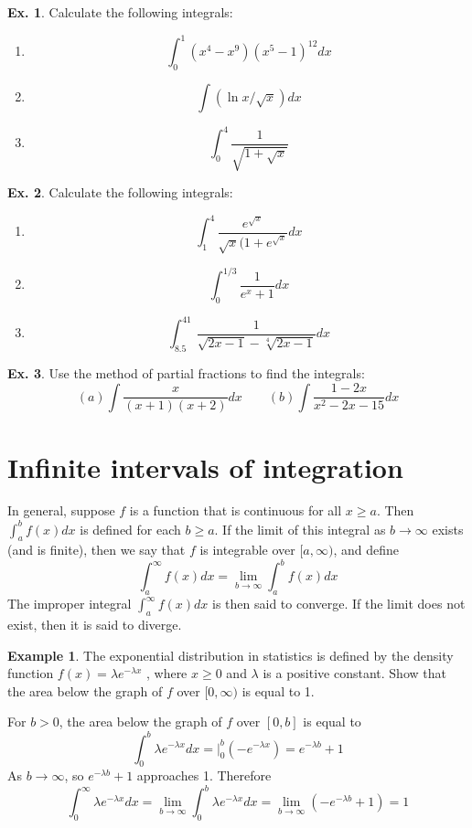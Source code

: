 \documentclass[10pt,a4paper]{book}
\theoremstyle{definition}\newtheorem{definition}{Definition}
\theoremstyle{definition}\newtheorem{fact}{Fact}
\theoremstyle{definition}\newtheorem{ex}{Ex.}
\theoremstyle{definition}\newtheorem{project}{Project}
\theoremstyle{definition}\newtheorem{problem}{Problem}
\theoremstyle{definition}\newtheorem{example}{Example}
\numberwithin{theorem}{chapter}
\numberwithin{corollary}{chapter}
\numberwithin{assumption}{chapter}
\numberwithin{definition}{chapter}
\numberwithin{prop}{chapter}
\numberwithin{notation}{chapter}
\numberwithin{problem}{chapter}
\numberwithin{example}{chapter}
\numberwithin{fact}{chapter}
\numberwithin{ex}{chapter}
\begin{document}
	\begin{ex}
		Calculate the following integrals:
		\begin{enumerate}[label=(\alph*)]
			\item $$\int_0^1 (x^4-x^9)(x^5-1)^{12}dx$$
			\item $$\int (\ln x/\sqrt{x})dx$$
			\item $$\int_0^4 \frac{1}{\sqrt{1+\sqrt{x}}}$$
		\end{enumerate}
	\end{ex}
	
	\begin{ex}
		Calculate the following integrals:
		\begin{enumerate}[label=(\alph*)]
			\item $$\int_1^4 \frac{e^{\sqrt{x}}}{\sqrt{x}(1+e^{\sqrt{x}}}dx$$
			\item $$\int_0^{1/3} \frac{1}{e^x+1} dx$$
			\item $$\int_{8.5}^{41} \frac{1}{\sqrt{2x-1}-\sqrt[4]{2x-1}}dx$$
		\end{enumerate}
	\end{ex}
	
	\begin{ex}
		Use the method of partial fractions to find the integrals:
		\begin{equation*}
			(a) \int \frac{x}{(x+1)(x+2)}dx \qquad
			(b) \int \frac{1-2x}{x^2-2x-15}dx
		\end{equation*}
	\end{ex}
	
	\section{Infinite intervals of integration}
	
	In general, suppose $f$ is a function that is continuous for all $x \geq a$. Then $\int_a^b f(x)dx$ is defined for each $b \geq a$. If the limit of this integral as $b \rightarrow \infty$ exists (and is finite), then we say that $f$ is integrable over $[a, \infty)$, and define
	$$\int_a^{\infty} f(x) dx = \lim_{b \rightarrow \infty} \int_a^b f(x) dx$$
	The improper integral $\int_a^{\infty} f(x)dx$ is then said to converge. If the limit does not exist, then it is said to diverge.
	
	\begin{example}
		The exponential distribution in statistics is defined by the density function $f (x) = \lambda e^{-\lambda x}$ , where $x \geq 0$ and $\lambda$ is a positive constant. Show that the area below the graph of $f$ over $[0, \infty)$ is equal to 1.
		
		For $b > 0$, the area below the graph of $f$ over $[0, b]$ is equal to
		$$\int_0^b \lambda e^{-\lambda x}dx = \bigg |_0^b (-e^{-\lambda x}) = e^{-\lambda b} + 1$$
		As $b \rightarrow \infty$, so $e^{-\lambda b}+1$ approaches 1. Therefore
		$$\int_0^{\infty} \lambda e^{-\lambda x} dx = \lim_{b \rightarrow \infty} \int_0^b \lambda e^{-\lambda x}dx = \lim_{b \rightarrow \infty} (-e^{-\lambda b} + 1) = 1$$
	\end{example}
	
\end{document}
